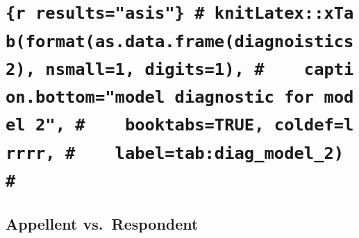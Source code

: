 \documentclass{monashthesis}
\begin{document}
\hypertarget{section-1}{%
\chapter{}\label{section-1}}

\hypertarget{r-resultsasis-knitlatexxtabformatas.data.framediagnoistics2-nsmall1-digits1-caption.bottommodel-diagnostic-for-model-2-booktabstrue-coldeflrrrr-labeltabdiag_model_2}{%
\chapter{\texorpdfstring{\texttt{\{r\ results="asis"\}\ \#\ knitLatex::xTab(format(as.data.frame(diagnoistics2),\ nsmall=1,\ digits=1),\ \#\ \ \ \ caption.bottom="model\ diagnostic\ for\ model\ 2",\ \#\ \ \ \ booktabs=TRUE,\ coldef=\textquotesingle{}lrrrr\textquotesingle{},\ \#\ \ \ \ label=\textquotesingle{}tab:diag\_model\_2\textquotesingle{})\ \#}}{\{r results="asis"\} \# knitLatex::xTab(format(as.data.frame(diagnoistics2), nsmall=1, digits=1), \#    caption.bottom="model diagnostic for model 2", \#    booktabs=TRUE, coldef='lrrrr', \#    label='tab:diag\_model\_2') \#}}\label{r-resultsasis-knitlatexxtabformatas.data.framediagnoistics2-nsmall1-digits1-caption.bottommodel-diagnostic-for-model-2-booktabstrue-coldeflrrrr-labeltabdiag_model_2}}

\hypertarget{appellent-vs.respondent}{%
\section{Appellent vs.~Respondent}\label{appellent-vs.respondent}}
\end{document}
